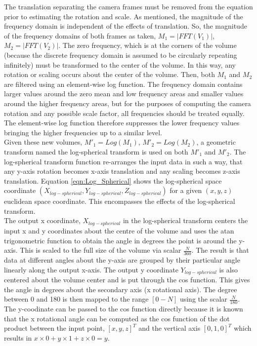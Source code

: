 The translation separating the camera frames must be removed from the equation prior to estimating the rotation and scale. As mentioned, the magnitude of the frequency domain is independent of the effects of translation. So, the magnitude of the frequency domains of both frames as taken, $M_1 = |FFT(V_1)|$, $M_2 = |FFT(V_2)|$. The zero frequency, which is at the corners of the volume (because the discrete frequency domain is assumed to be circularly repeating infinitely) must be transformed to the center of the volume. In this way, any rotation or scaling occurs about the center of the volume. Then, both $M_1$ and $M_2$ are filtered using an element-wise log function. The frequency domain contains larger values around the zero mean and low frequency areas and smaller values around the higher frequency areas, but for the purposes of computing the camera rotation and any possible scale factor, all frequencies should be treated equally. The element-wise log function therefore suppresses the lower frequency values bringing the higher frequencies up to a similar level. \\

Given these new volumes, $M'_1 = Log(M_1)$, $M'_2 = Log(M_2)$, a geometric transform named the log-spherical transform is used on both $M'_1$ and $M'_2$. The log-spherical transform function re-arranges the input data in such a way, that any y-axis rotation becomes x-axis translation and any scaling becomes z-axis translation. Equation \ref{eqn:Log_Spherical} shows the log-spherical space coordinate $(X_{log-spherical}, Y_{log-spherical}, Z_{log-spherical})$ for a given $(x,y,z)$ euclidean space coordinate. This encompasses the effects of the log-spherical transform. \\


The output x coordinate, $X_{log-spherical}$ in the log-spherical transform centers the input x and y coordinates about the centre of the volume and uses the atan trigonometric function to obtain the angle in degrees the point is around the y-axis. This is scaled to the full size of the volume via scalar $\frac{N}{360}$. The result is that data at different angles about the y-axis are grouped by their particular angle linearly along the output x-axis. The output y coordinate $Y_{log-spherical}$ is also centered about the volume center and is put through the cos function. This gives the angle in degrees about the secondary axis (x rotational axis). The degree between 0 and 180 is then mapped to the range $[0-N]$ using the scalar $\frac{N}{180}$. The y-coodinate can be passed to the cos function directly because it is known that the x rotational angle can be computed as the cos function of the dot product between the input point, $[x,y,z]^T$ and the vertical axis $[0,1,0]^T$ which results in $x \times 0 + y \times 1 + z \times 0 = y$. \\

